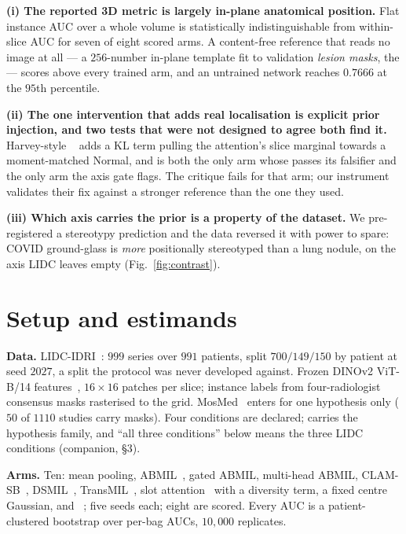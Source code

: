 \documentclass[conference]{IEEEtran}
\begin{document}
\textbf{(i) The reported 3D metric is largely in-plane anatomical position.}
Flat instance AUC over a whole volume is statistically indistinguishable from
within-slice AUC for seven of eight scored arms. A content-free reference that
reads no image at all --- a $256$-number in-plane template fit to validation
\emph{lesion masks}, the \maskref{} --- scores above every trained arm, and an
untrained network reaches $0.7666$ at the $95$th percentile.

\textbf{(ii) The one intervention that adds real localisation is explicit
prior injection, and two tests that were not designed to agree both find it.}
Harvey-style \armNG{}~\citep{harvey2026normal} adds a KL term pulling the
attention's slice marginal towards a moment-matched Normal, and is both the
only arm whose \pss{} passes its falsifier and the only arm the axis gate
flags. The critique fails for that arm; our instrument validates their fix
against a stronger reference than the one they used.

\textbf{(iii) Which axis carries the prior is a property of the dataset.} We
pre-registered a stereotypy prediction and the data reversed it with power to
spare: COVID ground-glass is \emph{more} positionally stereotyped than a lung
nodule, on the axis LIDC leaves empty (Fig.~\ref{fig:contrast}).

\section{Setup and estimands}

\textbf{Data.} LIDC-IDRI~\citep{armato2011lidc}: $999$ series over $991$
patients, split $700/149/150$ by patient at seed $2027$, a split the protocol
was never developed against. Frozen DINOv2 ViT-B/14
features~\citep{oquab2024dinov2}, $16{\times}16$ patches per slice; instance
labels from four-radiologist consensus masks rasterised to the grid.
MosMed~\citep{morozov2020mosmed} enters for one hypothesis only ($50$ of
$1110$ studies carry masks). Four conditions are declared; \condA{} carries
the hypothesis family, and ``all three conditions'' below means the three LIDC
conditions (companion, \S3).

\textbf{Arms.} Ten: mean pooling, ABMIL~\citep{ilse2018}, gated ABMIL,
multi-head ABMIL, CLAM-SB~\citep{lu2021clam}, DSMIL~\citep{li2021dsmil},
TransMIL~\citep{shao2021transmil}, slot attention~\citep{locatello2020slot}
with a diversity term, a fixed centre Gaussian, and
\armNG{}~\citep{harvey2026normal}; five seeds each; eight are scored. Every
AUC is a patient-clustered bootstrap over per-bag AUCs, $10{,}000$ replicates.
\end{document}
